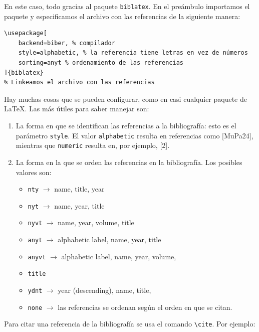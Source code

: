 \documentclass[12pt, spanish]{report}
\theoremstyle{definition} %
\theoremstyle{remark} %
\theoremstyle{plain} %
\theoremstyle{plain} %
\theoremstyle{plain} %
\theoremstyle{plain} %
\theoremstyle{plain} %
\theoremstyle{remark} %
\numberwithin{defn}{chapter}
\begin{document}
En este caso, todo gracias al paquete \verb|biblatex|. En el preámbulo importamos el paquete y especificamos el archivo con las referencias de la siguiente manera:
\begin{verbatim}
\usepackage[
    backend=biber, % compilador
    style=alphabetic, % la referencia tiene letras en vez de números
    sorting=anyt % ordenamiento de las referencias
]{biblatex}
% Linkeamos el archivo con las referencias

\end{verbatim}
Hay muchas cosas que se pueden configurar, como en casi cualquier paquete de \LaTeX. Las más útiles para saber manejar son:
\begin{enumerate}
    \item La forma en que se identifican las referencias a la bibliografía: esto es el parámetro \verb|style|. El valor \verb|alphabetic| resulta en referencias como [MuPa24], mientras que \verb|numeric| resulta en, por ejemplo, [2].
    \item La forma en la que se orden las referencias en la bibliografía. Los posibles valores son:
    \begin{itemize}
        \item \verb|nty|   $\to$ name, title, year
        \item \verb|nyt|	$\to$ name, year, title
        \item \verb|nyvt|	$\to$ name, year, volume, title
        \item \verb|anyt|	$\to$ alphabetic label, name, year, title
        \item \verb|anyvt|	$\to$ alphabetic label, name, year, volume,
        \item \verb|title|
        \item \verb|ydnt|	$\to$ year (descending), name, title,
        \item \verb|none|	$\to$ las referencias se ordenan según el orden en que se citan.
    \end{itemize}
\end{enumerate}
Para citar una referencia de la bibliografía se usa el comando \verb|\cite|. Por ejemplo:
\begin{center}
    \noindent{}
\end{center}
\end{document}
